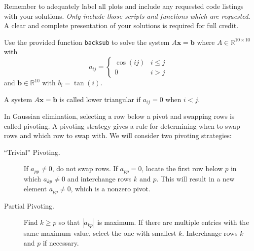 \documentclass[12pt]{exam}
\begin{document}
Remember to adequately label all plots and include any requested code listings with your solutions. \emph{Only include those scripts and functions which are requested}. A clear and complete presentation of your solutions is required for full credit.

\begin{questions}

\question Use the provided function \verb$backsub$ to solve the system $A \mathbf{x} = \mathbf{b}$ where $A \in \mathbb{R}^{10\times 10}$ with
\[a_{ij} = \begin{cases} \cos(ij) & i \leq j \\ 0 & i > j \end{cases}\]
and $\mathbf{b} \in \mathbb{R}^{10}$ with $b_i = \tan(i)$.

\question A system $A \mathbf{x} = \mathbf{b}$ is called lower triangular if $a_{ij} = 0$ when $i < j$.


\question In Gaussian elimination, selecting a row below a pivot and swapping rows is called pivoting. A pivoting strategy gives a rule for determining when to swap rows and which row to swap with. We will consider two pivoting strategies:

\begin{description}
\item[``Trivial'' Pivoting.] If $a_{pp} \neq 0$, do not swap rows. If $a_{pp} = 0$, locate the first row below $p$ in which $a_{kp} \neq 0$ and interchange rows $k$ and $p$. This will result in a new element $a_{pp} \neq 0$, which is a nonzero pivot.
\item[Partial Pivoting.] Find $k \geq p$ so that $|a_{kp}|$ is maximum. If there are multiple entries with the same maximum value, select the one with smallest $k$. Interchange rows $k$ and $p$ if necessary.
\end{description}


\end{questions}
\end{document}
